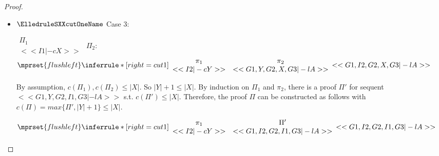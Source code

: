 \begin{proof}
\begin{enumerate}
\begin{itemize}
    \item $\ElledruleSXXcutOneName$ Case 3:
      \begin{center}
        \scriptsize
        \begin{math}
          \begin{array}{c}
            \Pi_1 \\
            {<<I1 |-c X>>}
          \end{array}
        \end{math}
        \qquad\qquad
        $\Pi_2$:
        \begin{math}
          $$\mprset{flushleft}
          \inferrule* [right={\tiny cut1}] {
            {
              \begin{array}{cc}
                \pi_1 & \pi_2 \\
                {<<I2 |-c Y>>} & {<<G1, Y, G2, X, G3 |-l A>>}
              \end{array}
            }
          }{<<G1, I2, G2, X, G3 |-l A>>}
        \end{math}
      \end{center}
      By assumption, $c(\Pi_1),c(\Pi_2)\leq |X|$. So $|Y|+1 \leq |X|$. By induction on $\Pi_1$
      and $\pi_2$, there is a proof $\Pi'$ for sequent $<<G1, Y, G2, I1, G3 |-l A>>$ s.t.
      $c(\Pi') \leq |X|$. Therefore, the proof $\Pi$ can be constructed as follows with
      $c(\Pi) = max\{\Pi', |Y|+1\} \leq |X|$.
      \begin{center}
        \scriptsize
        \begin{math}
          $$\mprset{flushleft}
          \inferrule* [right={\tiny cut1}] {
            {
              \begin{array}{cc}
                \pi_1 & \Pi' \\
                {<<I2 |-c Y>>} & {<<G1, I2, G2, I1, G3 |-l A>>}
              \end{array}
            }
          }{<<G1, I2, G2, I1, G3 |-l A>>}
        \end{math}
      \end{center}


\end{itemize}
\end{enumerate}
\end{proof}
